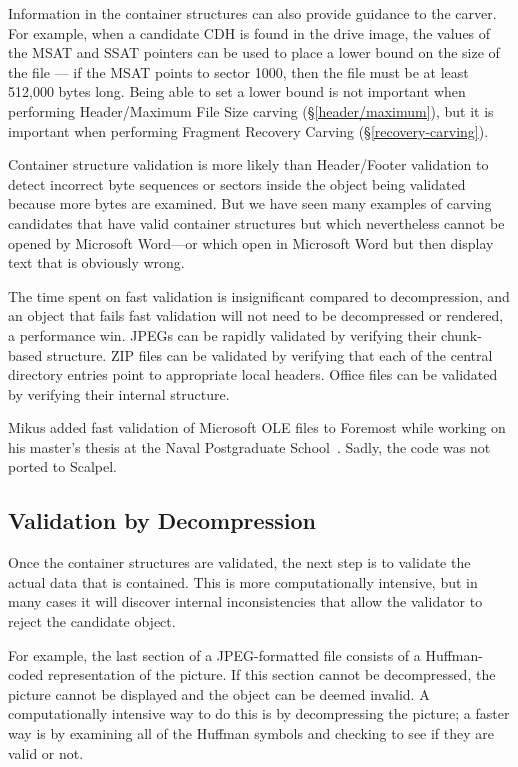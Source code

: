 \documentclass[11pt,letter]{article}
\newcommand{\secref}[1]{\S\ref{#1}}
\begin{document}
Information in the container structures can also provide guidance to
the carver. For example, when a candidate CDH is found in the drive
image, the values of the MSAT and SSAT pointers can be used to place a
lower bound on the size of the file --- if the MSAT points to sector
1000, then the file must be at least 512,000 bytes long. Being able to
set a lower bound is not important when performing Header/Maximum File
Size carving (\secref{header/maximum}), but it is important when
performing Fragment Recovery Carving (\secref{recovery-carving}).

Container structure validation is more likely than Header/Footer
validation to detect incorrect
byte sequences or sectors inside the object being validated because
more bytes are examined. But we have seen many examples of
carving candidates
that have valid container structures but which
nevertheless cannot be opened by Microsoft Word---or which open in
Microsoft Word but then display text that is obviously wrong. 

The time spent on fast
validation is insignificant compared to decompression, and an object
that fails fast validation will not need to be decompressed or
rendered, a performance win. JPEGs can be rapidly validated by
verifying their chunk-based structure. ZIP files can be validated by
verifying that each of the central directory entries point to
appropriate local headers. Office files can be validated by verifying
their internal structure.

Mikus added fast validation of Microsoft OLE files to Foremost while
working on his master's thesis at the Naval Postgraduate
School~\cite{mikus}. Sadly, the code was not ported to Scalpel. 



\subsection{Validation by Decompression}
Once the container structures are validated, the next step is to
validate the actual data that is contained. This is more
computationally intensive, but in many cases it will discover internal
inconsistencies that allow the validator to reject the candidate object.

For example, the last section of a JPEG-formatted file consists of a
Huffman-coded representation of the picture. If this section cannot be
decompressed, the picture cannot be displayed and the object can be
deemed invalid. A computationally intensive way to do this is by
decompressing the picture; a faster way is by examining all
of the Huffman symbols and checking to see if they are valid or not.
\end{document}
